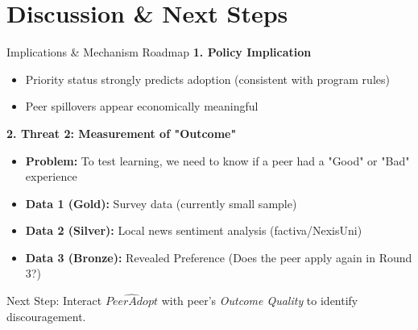 \documentclass[10pt]{beamer}
\begin{document}
\section{Discussion \& Next Steps}

\begin{frame}{Implications \& Mechanism Roadmap}
  \textbf{1. Policy Implication}
  \begin{itemize}
    \item Priority status strongly predicts adoption (consistent with program rules)
    \item Peer spillovers appear economically meaningful
  \end{itemize}

  \vspace{1em}
  \textbf{2. Threat 2: Measurement of "Outcome"}
  \begin{itemize}
      \item \textbf{Problem:} To test learning, we need to know if a peer had a "Good" or "Bad" experience
      \item \textbf{Data 1 (Gold):} Survey data (currently small sample)
      \item \textbf{Data 2 (Silver):} Local news sentiment analysis (factiva/NexisUni)
      \item \textbf{Data 3 (Bronze):} Revealed Preference (Does the peer apply again in Round 3?)
  \end{itemize}
  
  \vspace{1em}
  \alert{Next Step:} Interact $\widehat{PeerAdopt}$ with peer's \textit{Outcome Quality} to identify discouragement.
\end{frame}
\end{document}
